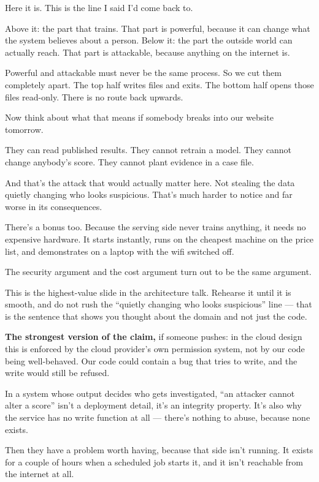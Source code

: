\documentclass[11pt]{article}
\begin{document}

\begin{saythis}
Here it is. This is the line I said I'd come back to.

Above it: the part that trains. That part is powerful, because it can change
what the system believes about a person. Below it: the part the outside world
can actually reach. That part is attackable, because anything on the internet
is.

Powerful and attackable must never be the same process. So we cut them
completely apart. The top half writes files and exits. The bottom half opens
those files read-only. There is no route back upwards.

Now think about what that means if somebody breaks into our website tomorrow.

They can read published results. They cannot retrain a model. They cannot
change anybody's score. They cannot plant evidence in a case file.

And that's the attack that would actually matter here. Not stealing the data
\bt quietly changing who looks suspicious. That's much harder to notice and far
worse in its consequences.

There's a bonus too. Because the serving side never trains anything, it needs
no expensive hardware. It starts instantly, runs on the cheapest machine on the
price list, and demonstrates on a laptop with the wifi switched off.

The security argument and the cost argument turn out to be the same argument.
\end{saythis}

\begin{means}
This is the highest-value slide in the architecture talk. Rehearse it until it
is smooth, and do not rush the ``quietly changing who looks suspicious'' line
--- that is the sentence that shows you thought about the domain and not just
the code.

\textbf{The strongest version of the claim,} if someone pushes: in the cloud
design this is enforced by the cloud provider's own permission system, not by
our code being well-behaved. Our code could contain a bug that tries to write,
and the write would still be refused.
\end{means}

\begin{asked}
 In a system whose output decides who
gets investigated, ``an attacker cannot alter a score'' isn't a deployment
detail, it's an integrity property. It's also why the service has no write
function at all --- there's nothing to abuse, because none exists.

 Then they have a
problem worth having, because that side isn't running. It exists for a couple
of hours when a scheduled job starts it, and it isn't reachable from the
internet at all.
\end{asked}
\end{document}
